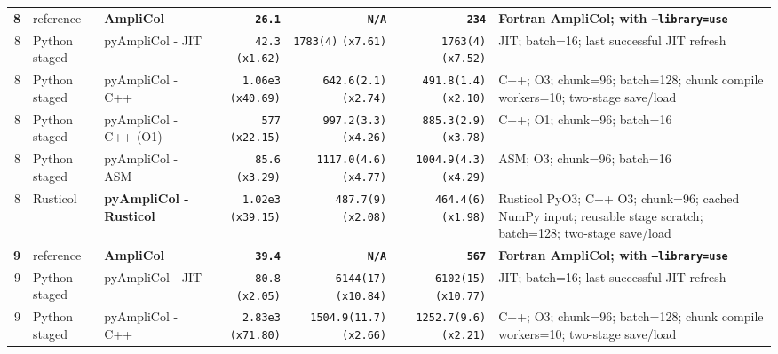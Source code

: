 \documentclass[10pt]{article}
\begin{document}
\begin{landscape}
\begin{center}
\begin{tabular}{@{}r L{0.92in} L{1.52in} r r r L{3.18in}@{}}
\midrule[0.58pt]
 \textbf{8} & reference & \textbf{AmpliCol} & \textbf{\texttt{26.1}} & \textbf{\texttt{N/A}} & \textbf{\texttt{234}} & \textbf{Fortran AmpliCol; with \texttt{--library=use}} \\
8 & Python staged & pyAmpliCol - JIT & \texttt{42.3} \textcolor{speedorange}{\texttt{(x1.62)}} & \texttt{1783(4)} \textcolor{speedred}{\texttt{(x7.61)}} & \texttt{1763(4)} \textcolor{speedred}{\texttt{(x7.52)}} & JIT; batch=16; last successful JIT refresh \\
8 & Python staged & pyAmpliCol - C++ & \texttt{1.06e3} \textcolor{speedred}{\texttt{(x40.69)}} & \texttt{642.6(2.1)} \textcolor{speedred}{\texttt{(x2.74)}} & \texttt{491.8(1.4)} \textcolor{speedred}{\texttt{(x2.10)}} & C++; O3; chunk=96; batch=128; chunk compile workers=10; two-stage save/load \\
8 & Python staged & pyAmpliCol - C++ (O1) & \texttt{577} \textcolor{speedred}{\texttt{(x22.15)}} & \texttt{997.2(3.3)} \textcolor{speedred}{\texttt{(x4.26)}} & \texttt{885.3(2.9)} \textcolor{speedred}{\texttt{(x3.78)}} & C++; O1; chunk=96; batch=16 \\
8 & Python staged & pyAmpliCol - ASM & \texttt{85.6} \textcolor{speedred}{\texttt{(x3.29)}} & \texttt{1117.0(4.6)} \textcolor{speedred}{\texttt{(x4.77)}} & \texttt{1004.9(4.3)} \textcolor{speedred}{\texttt{(x4.29)}} & ASM; O3; chunk=96; batch=16 \\
 8 & Rusticol & \textbf{pyAmpliCol - Rusticol} & \texttt{1.02e3} \textcolor{speedred}{\texttt{(x39.15)}} & \texttt{487.7(9)} \textcolor{speedred}{\texttt{(x2.08)}} & \texttt{464.4(6)} \textcolor{speedorange}{\texttt{(x1.98)}} & Rusticol PyO3; C++ O3; chunk=96; cached NumPy input; reusable stage scratch; batch=128; two-stage save/load \\
\midrule[0.58pt]
 \textbf{9} & reference & \textbf{AmpliCol} & \textbf{\texttt{39.4}} & \textbf{\texttt{N/A}} & \textbf{\texttt{567}} & \textbf{Fortran AmpliCol; with \texttt{--library=use}} \\
9 & Python staged & pyAmpliCol - JIT & \texttt{80.8} \textcolor{speedred}{\texttt{(x2.05)}} & \texttt{6144(17)} \textcolor{speedred}{\texttt{(x10.84)}} & \texttt{6102(15)} \textcolor{speedred}{\texttt{(x10.77)}} & JIT; batch=16; last successful JIT refresh \\
9 & Python staged & pyAmpliCol - C++ & \texttt{2.83e3} \textcolor{speedred}{\texttt{(x71.80)}} & \texttt{1504.9(11.7)} \textcolor{speedred}{\texttt{(x2.66)}} & \texttt{1252.7(9.6)} \textcolor{speedred}{\texttt{(x2.21)}} & C++; O3; chunk=96; batch=128; chunk compile workers=10; two-stage save/load \\

\end{tabular}
\end{center}
\end{landscape}
\end{document}
